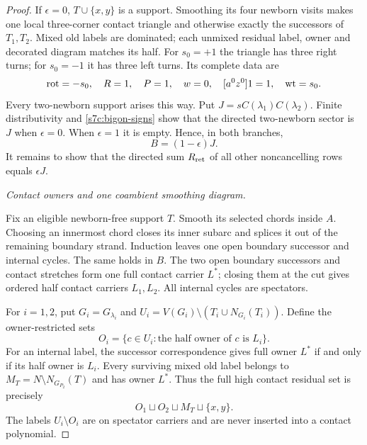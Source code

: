 \begin{proof}
If $\epsilon=0$, $T\cup\{x,y\}$ is a support.  Smoothing its four
newborn visits makes one local three-corner contact triangle and otherwise
exactly the successors of $T_1,T_2$.  Mixed old labels are dominated;
each unmixed residual label, owner and decorated diagram matches its half.
For $s_0=+1$ the triangle has three right turns; for $s_0=-1$ it has
three left turns.  Its complete data are
\begin{equation}\label{s7c:triangle-data}
 \operatorname{rot}=-s_0,\quad R=1,\quad P=1,\quad w=0,\quad
 [a^0z^0]1=1,\quad\operatorname{wt}=s_0.
\end{equation}
Every two-newborn support arises this way.  Put
$J=sC(\lambda_1)C(\lambda_2)$.  Finite distributivity and
\eqref{s7c:bigon-signs} show that the directed two-newborn sector is
$J$ when $\epsilon=0$.  When $\epsilon=1$ it is empty.  Hence, in
both branches,
\begin{equation}\label{s7c:sector-split}
 B=(1-\epsilon)J.
\end{equation}
It remains to show that the directed sum $R_{\rm ret}$ of all other
noncancelling rows equals $\epsilon J$.

\par\medskip\noindent\emph{Contact owners and one coambient smoothing diagram.}\par

Fix an eligible newborn-free support $T$.  Smooth its selected chords
inside $A$.  Choosing an innermost chord closes its inner subarc and
splices it out of the remaining boundary strand.  Induction leaves one
open boundary successor and internal cycles.  The same holds in $B$.
The two open boundary successors and contact stretches form one full
contact carrier $L^*$; closing them at the cut gives ordered half contact
carriers $L_1,L_2$.  All internal cycles are spectators.

For $i=1,2$, put $G_i=G_{\lambda_i}$ and
$U_i=V(G_i)\setminus(T_i\cup N_{G_i}(T_i))$.  Define the
owner-restricted sets
\begin{equation}\label{s7c:owner-restriction}
 O_i=\{c\in U_i:\text{the half owner of }c\text{ is }L_i\}.
\end{equation}
For an internal label, the successor correspondence gives full owner
$L^*$ if and only if its half owner is $L_i$.  Every surviving mixed
old label belongs to
$M_T=N\setminus N_{G_{P_2}}(T)$ and has owner $L^*$.
Thus the full high contact residual set is precisely
\begin{equation}\label{s7c:full-contact-set}
 O_1\sqcup O_2\sqcup M_T\sqcup\{x,y\}.
\end{equation}
The labels $U_i\setminus O_i$ are on spectator carriers and are never
inserted into a contact polynomial.


\end{proof}
